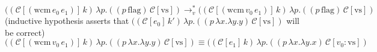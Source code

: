 \documentclass[ms,electronic,twosidetoc,letterpaper,chaptercenter,parttop]{byumsphd}
\begin{document}




\[
((\mathcal{C}[(\mathrm{wcm}\,e_0\,e_1)]\,k)\,\lambda p.((p\,\mathrm{flag})\,\mathcal{C}[\mathrm{vs}])\rightarrow_{v}^{*}((\mathcal{C}[(\mathrm{wcm}\,v_0\,e_1)]\,k)\,\lambda p.((p\,\mathrm{flag})\,\mathcal{C}[\mathrm{vs}])
\]
(inductive hypothesis asserts that $((\mathcal{C}[e_0]\,k')\,\lambda p.((p\,\lambda x.\lambda y.y)\,\mathcal{C}[\mathrm{vs}])$ will be correct)
\[
((\mathcal{C}[(\mathrm{wcm}\,v_0\,e_1)]\,k)\,\lambda p.((p\,\lambda x.\lambda y.y)\,\mathcal{C}[\mathrm{vs}])\equiv((\mathcal{C}[e_1]\,k)\,\lambda p.((p\,\lambda x.\lambda y.x)\,\mathcal{C}[v_0 : \mathrm{vs}])
\]









\end{document}
